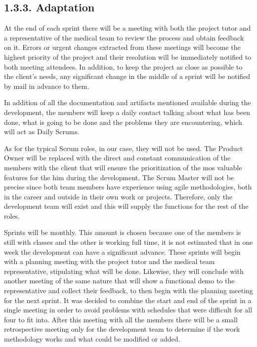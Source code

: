      \subsection*{1.3.3. Adaptation}
    
    At the end of each sprint there will be a meeting with both the project tutor and a representative of the medical team to review the process and obtain feedback on it. Errors or urgent changes extracted from these meetings will become the highest priority of the project and their resolution will be immediately notified to both meeting attendees. In addition, to keep the project as close as possible to the client's needs, any significant change in the middle of a sprint will be notified by mail in advance to them.\newline
    
    In addition of all the documentation and artifacts mentioned available during the development, the members will keep a daily contact talking about what has been done, what is going to be done and the problems they are encountering, which will act as Daily Scrums.\newline
	
	As for the typical Scrum roles, in our case, they will not be used. The Product Owner will be replaced with the direct and constant communication of the members with the client that will ensure the prioritization of the mos valuable features for the him during the development. The Scrum Master will not be precise since both team members have experience using agile methodologies, both in the career and outside in their own work or projects. Therefore, only the development team will exist and this will supply the functions for the rest of the roles.\newline
	
	Sprints will be monthly. This amount is chosen because one of the members is still with classes and the other is working full time, it is not estimated that in one week the development can have a  significant advance. These sprints will begin with a planning meeting with the project tutor and the medical team representative, stipulating what will be done. Likewise, they will conclude with another meeting of the same nature that will show a functional demo to the representative and collect their feedback, to then begin with the planning meeting for the next sprint. It was decided to combine the start and end of the sprint in a single meeting in order to avoid problems with schedules that were difficult for all four to fit into. After this meeting with all the members there will be a small retrospective meeting only for the development team to determine if the work methodology works and what could be modified or added.